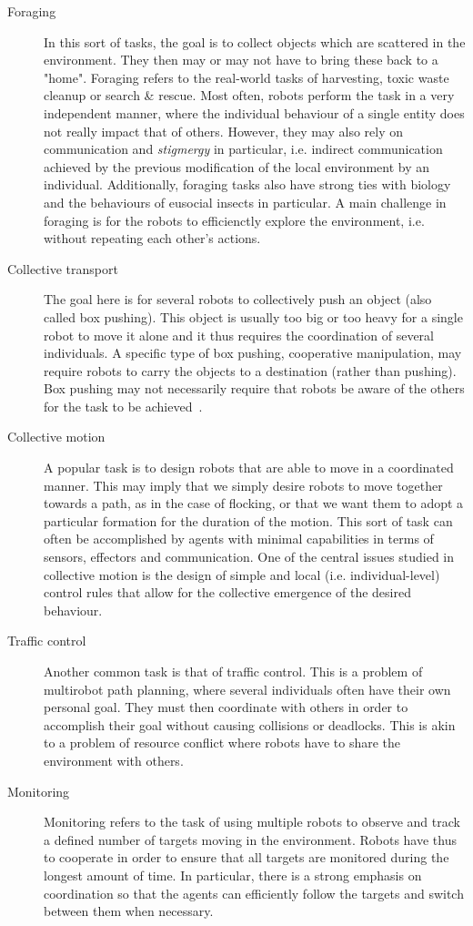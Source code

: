     \begin{description}
      \item[Foraging] {In this sort of tasks, the goal is to collect objects which are scattered in the environment. They then may or may not have to bring these back to a "home". Foraging refers to the real-world tasks of harvesting, toxic waste cleanup or search \& rescue. Most often, robots perform the task in a very independent manner, where the individual behaviour of a single entity does not really impact that of others. However, they may also rely on communication and \emph{stigmergy} in particular, i.e. indirect communication achieved by the previous modification of the local environment by an individual. Additionally, foraging tasks also have strong ties with biology and the behaviours of eusocial insects in particular. A main challenge in foraging is for the robots to efficienctly explore the environment, i.e. without repeating each other's actions.}

      \item[Collective transport] {The goal here is for several robots to collectively push an object (also called box pushing). This object is usually too big or too heavy for a single robot to move it alone and it thus requires the coordination of several individuals. A specific type of box pushing, cooperative manipulation, may require robots to carry the objects to a destination (rather than pushing). Box pushing may not necessarily require that robots be aware of the others for the task to be achieved~\parencite{Sen1994}.}

      \item[Collective motion] {A popular task is to design robots that are able to move in a coordinated manner. This may imply that we simply desire robots to move together towards a path, as in the case of flocking, or that we want them to adopt a particular formation for the duration of the motion. This sort of task can often be accomplished by agents with minimal capabilities in terms of sensors, effectors and communication. One of the central issues studied in collective motion is the design of simple and local (i.e. individual-level) control rules that allow for the collective emergence of the desired behaviour.}

      \item[Traffic control] {Another common task is that of traffic control. This is a problem of multirobot path planning, where several individuals often have their own personal goal. They must then coordinate with others in order to accomplish their goal without causing collisions or deadlocks. This is akin to a problem of resource conflict where robots have to share the environment with others.}

      \item[Monitoring] {Monitoring refers to the task of using multiple robots to observe and track a defined number of targets moving in the environment. Robots have thus to cooperate in order to ensure that all targets are monitored during the longest amount of time. In particular, there is a strong emphasis on coordination so that the agents can efficiently follow the targets and switch between them when necessary.}
    \end{description}

